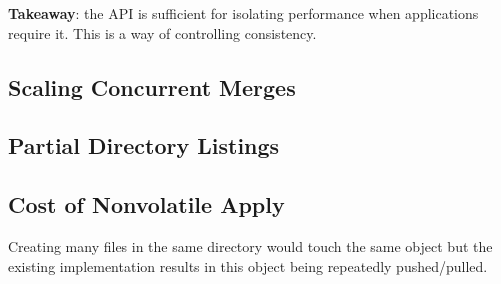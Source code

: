 \noindent\textbf{Takeaway}: the API is sufficient for isolating performance
when applications require it. This is a way of controlling consistency.

\subsection{Scaling Concurrent Merges}

\subsection{Partial Directory Listings}

\subsection{Cost of Nonvolatile Apply}
Creating many files in the same directory would touch the same object but the
existing implementation results in this object being repeatedly pushed/pulled.


